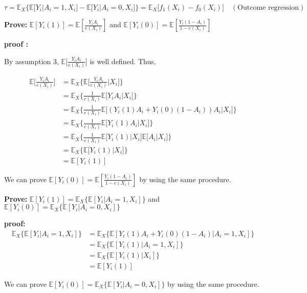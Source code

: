 \documentclass[
]{book}
\begin{document}
\[\tau = \mathbb{E}_X \big\{ \mathbb{E} \big[ Y_i|A_i=1,X_i\big] - \mathbb{E} 
\big[ Y_i|A_i=0,X_i\big]\big\} = \mathbb{E}_X\big[f_1(X_i) - f_0(X_i)\big]
\,\,\,\,\,\,(\text{Outcome regression})\]

\textbf{Prove:} \(\mathbb{E}[Y_i(1)] = \mathbb{E}[\frac{Y_iA_i}{e(X_i)}]\) and \(\mathbb{E}[Y_i(0)] = \mathbb{E}[\frac{Y_i(1-A_i)}{1-e(X_i)}]\)

\textbf{proof :}

By assumption 3, \(\mathbb{E}\big[\frac{Y_iA_i}{e(X_i)}\big]\) is well defined. Thus,

\begin{align*}
\mathbb{E}\big[\frac{Y_iA_i}{e(X_i)}\big] &=\mathbb{E}_X \big\{
\mathbb{E}\big[\frac{Y_iA_i}{e(X_i)} | X_i\big] \big\} \\
&= \mathbb{E}_X \big\{ \frac{1}{e(X_i)} \mathbb{E} \big[ Y_iA_i | X_i\big] \big\} \\
&= \mathbb{E}_X \big\{ \frac{1}{e(X_i)} \mathbb{E} \big[ (Y_{i}(1)A_i + Y_{i}(0)(1-A_i))A_i | X_i\big] \big\} \\
&= \mathbb{E}_X \big\{ \frac{1}{e(X_i)} \mathbb{E} \big[ Y_i(1)A_i | X_i\big] \big\} \\
&= \mathbb{E}_X \big\{ \frac{1}{e(X_i)} \mathbb{E} \big[ Y_i(1) | X_i\big] \mathbb{E} \big[ A_i | X_i\big] \big\} \\
&= \mathbb{E}_X \big\{ \mathbb{E} \big[ Y_i(1) | X_i\big] \big\} \\
&= \mathbb{E}[Y_i(1)]
\end{align*}

We can prove \(\mathbb{E}[Y_i(0)] = \mathbb{E}[\frac{Y_i(1-A_i)}{1-e(X_i)}]\) by using the same procedure.

\textbf{Prove:} \(\mathbb{E}[Y_i(1)]=\mathbb{E}_X\{ \mathbb{E}[Y_i | A_i=1, X_i] \}\) and \(\mathbb{E}[Y_i(0)]=\mathbb{E}_X\{ \mathbb{E}[Y_i | A_i=0, X_i] \}\)

\textbf{proof:}
\begin{align*}
\mathbb{E}_X\{ \mathbb{E}[Y_i | A_i=1, X_i] \} &= \mathbb{E}_X\{ \mathbb{E}[Y_{i}(1)A_i + Y_{i}(0)(1-A_i) | A_i=1, X_i] \} \\
&= \mathbb{E}_X\{ \mathbb{E}[Y_{i}(1) | A_i=1, X_i] \} \\
&= \mathbb{E}_X\{ \mathbb{E}[Y_{i}(1) |X_i] \} \\
&= \mathbb{E}[Y_{i}(1)]
\end{align*}

We can prove \(\mathbb{E}[Y_i(0)]=\mathbb{E}_X\{ \mathbb{E}[Y_i | A_i=0, X_i] \}\) by using the same procedure.
\end{document}
